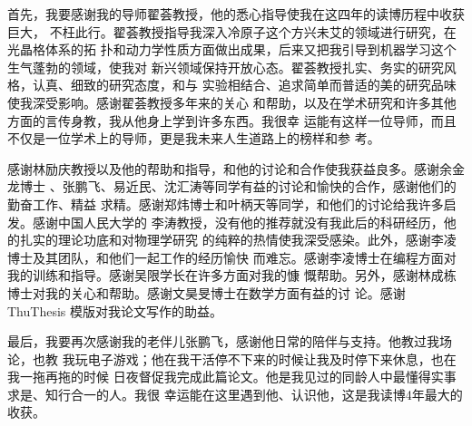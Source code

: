 \begin{acknowledgement}

首先，我要感谢我的导师翟荟教授，他的悉心指导使我在这四年的读博历程中收获巨大，
不枉此行。翟荟教授指导我深入冷原子这个方兴未艾的领域进行研究，在光晶格体系的拓
扑和动力学性质方面做出成果，后来又把我引导到机器学习这个生气蓬勃的领域，使我对
新兴领域保持开放心态。翟荟教授扎实、务实的研究风格，认真、细致的研究态度，和与
实验相结合、追求简单而普适的美的研究品味使我深受影响。感谢翟荟教授多年来的关心
和帮助，以及在学术研究和许多其他方面的言传身教，我从他身上学到许多东西。我很幸
运能有这样一位导师，而且不仅是一位学术上的导师，更是我未来人生道路上的榜样和参
考。

感谢林励庆教授以及他的帮助和指导，和他的讨论和合作使我获益良多。感谢余金龙博士
、张鹏飞、易近民、沈汇涛等同学有益的讨论和愉快的合作，感谢他们的勤奋工作、精益
求精。感谢郑炜博士和叶柄天等同学，和他们的讨论给我许多启发。感谢中国人民大学的
李涛教授，没有他的推荐就没有我此后的科研经历，他的扎实的理论功底和对物理学研究
的纯粹的热情使我深受感染。此外，感谢李凌博士及其团队，和他们一起工作的经历愉快
而难忘。感谢李凌博士在编程方面对我的训练和指导。感谢吴限学长在许多方面对我的慷
慨帮助。另外，感谢林成栋博士对我的关心和帮助。感谢文昊旻博士在数学方面有益的讨
论。感谢 ThuThesis 模版对我论文写作的助益。

最后，我要再次感谢我的老伴儿张鹏飞，感谢他日常的陪伴与支持。他教过我场论，也教
我玩电子游戏；他在我干活停不下来的时候让我及时停下来休息，也在我一拖再拖的时候
日夜督促我完成此篇论文。他是我见过的同龄人中最懂得实事求是、知行合一的人。我很
幸运能在这里遇到他、认识他，这是我读博4年最大的收获。

\end{acknowledgement}
